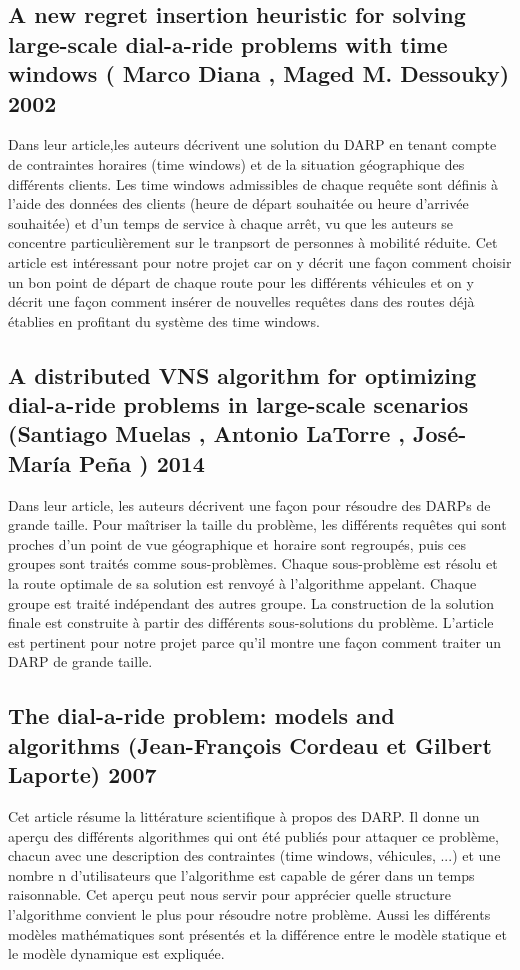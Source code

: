\documentclass[10pt,a4paper]{report}
\begin{document}
\subsection*{A new regret insertion heuristic for solving large-scale
dial-a-ride problems with time windows ( Marco Diana ,
 Maged M. Dessouky) 2002} 
 Dans leur article,les auteurs décrivent une solution du DARP en tenant compte de contraintes horaires (time windows) et de la situation géographique des différents clients. Les time windows admissibles de chaque requête sont définis à l'aide des données des clients (heure de départ souhaitée ou heure d'arrivée souhaitée) et d'un temps de service à chaque arrêt, vu que les auteurs se concentre particulièrement sur le tranpsort de personnes à mobilité réduite. Cet article est  intéressant pour notre projet car on y décrit une façon comment choisir un bon point de départ de chaque route pour les différents véhicules et on y décrit une façon comment insérer de nouvelles requêtes dans des routes déjà établies en profitant du système des time windows.
 \subsection*{A distributed VNS algorithm for optimizing dial-a-ride
problems in large-scale scenarios (Santiago Muelas , Antonio LaTorre , José-María Peña ) 2014}
Dans leur article, les auteurs décrivent une façon pour résoudre des DARPs de grande taille. Pour maîtriser la taille du problème, les différents requêtes qui sont proches d'un point de vue géographique et horaire sont regroupés, puis ces groupes sont traités comme sous-problèmes. Chaque sous-problème est résolu et la route optimale de sa solution est renvoyé à l'algorithme appelant. Chaque groupe est traité indépendant des autres groupe. La construction de la solution finale est construite à partir des différents sous-solutions du problème. L'article est pertinent pour notre projet parce qu'il montre une façon comment traiter un DARP de grande taille.
\subsection*{The dial-a-ride problem: models and algorithms     (Jean-François Cordeau et Gilbert Laporte) 2007}
Cet article résume la littérature scientifique à propos des DARP. Il donne un aperçu des différents algorithmes qui ont été publiés pour attaquer ce problème, chacun avec une description des contraintes (time windows, véhicules, ...) et une nombre n d'utilisateurs que l'algorithme est capable de gérer dans un temps raisonnable. Cet aperçu peut nous servir pour apprécier quelle structure l'algorithme convient le plus pour résoudre notre problème. Aussi les différents modèles mathématiques sont présentés et la différence entre le modèle statique et le modèle dynamique est expliquée.
\end{document}
